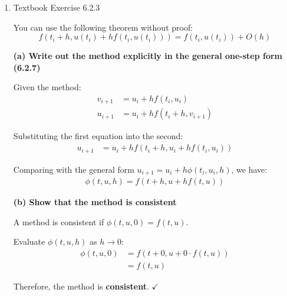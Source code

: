 \documentclass[reqno]{exam}
\begin{document}
\begin{enumerate}
\begin{solution}
          \textit{Exact solution at $t_2 = 1.5$:}
          \begin{align*}
            \hat{u}(1.5) = 1 + \frac{5}{1.5} = 1 + 3.333... \approx 4.3333
          \end{align*}

          \textit{Error:} $|u_2 - \hat{u}(1.5)| = |4.0 - 4.3333| = 0.3333$

        \end{solution}


  \item Textbook Exercise 6.2.3

        You can use the following theorem without proof: $$f(t_i + h, u(t_i) + h f(t_i, u(t_i))) = f(t_i, u(t_i)) + O(h)$$
        \begin{solution}
          \textbf{(a) Write out the method explicitly in the general one-step form (6.2.7)}

          Given the method:
          \begin{align*}
            v_{i+1} & = u_i + h f(t_i, u_i)         \\
            u_{i+1} & = u_i + h f(t_i + h, v_{i+1})
          \end{align*}

          Substituting the first equation into the second:
          \begin{align*}
            u_{i+1} & = u_i + h f(t_i + h, u_i + h f(t_i, u_i))
          \end{align*}

          Comparing with the general form $u_{i+1} = u_i + h\phi(t_i, u_i, h)$, we have:
          \begin{align*}
            \boxed{\phi(t, u, h) = f(t + h, u + h f(t, u))}
          \end{align*}

          \medskip

          \textbf{(b) Show that the method is consistent}

          A method is consistent if $\phi(t, u, 0) = f(t, u)$.

          Evaluate $\phi(t, u, h)$ as $h \to 0$:
          \begin{align*}
            \phi(t, u, 0) & = f(t + 0, u + 0 \cdot f(t, u)) \\
                          & = f(t, u)
          \end{align*}

          Therefore, the method is \textbf{consistent}. $\checkmark$


\end{solution}
\end{enumerate}
\end{document}
